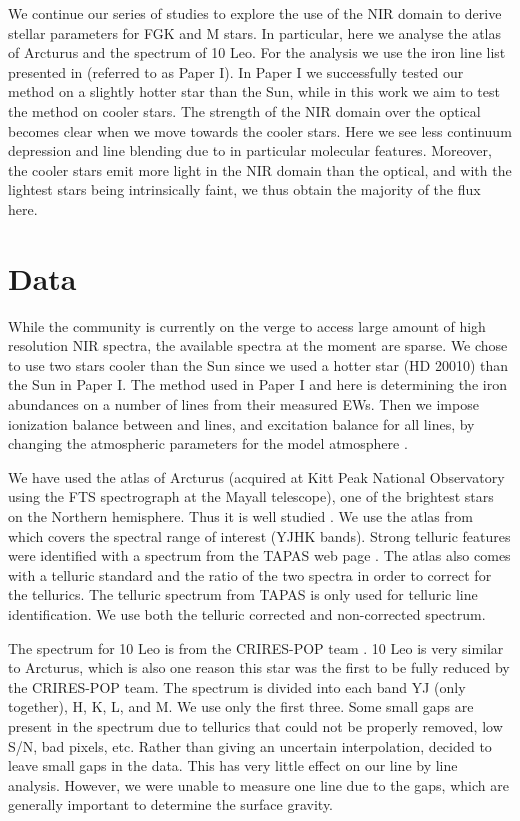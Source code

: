 \documentclass{aa}
\begin{document}
We continue our series of studies to explore the use of the NIR domain to derive
stellar parameters for FGK and M stars. In particular, here we analyse the atlas
of Arcturus and the spectrum of 10 Leo. For the analysis we use the iron line
list presented in \citet{Andreasen2016} (referred to as Paper I). In Paper I we
successfully tested our method on a slightly hotter star than the Sun, while in
this work we aim to test the method on cooler stars. The strength of the NIR
domain over the optical becomes clear when we move towards the cooler stars.
Here we see less continuum depression and line blending due to in particular
molecular features. Moreover, the cooler stars emit more light in the NIR domain
than the optical, and with the lightest stars being intrinsically faint, we thus
obtain the majority of the flux here.



\section{Data}
\label{sec:data}

While the community is currently on the verge to access large amount of high
resolution NIR spectra, the available spectra at the moment are sparse. We chose
to use two stars cooler than the Sun since we used a hotter star (HD 20010) than
the Sun in Paper I. The method used in Paper I and here is determining the iron
abundances on a number of lines from their measured EWs. Then we impose
ionization balance between  and  lines, and excitation
balance for all  lines, by changing the atmospheric parameters for
the model atmosphere \citep[][is used here]{Kurucz1993}.

We have used the atlas of Arcturus (acquired at Kitt Peak National Observatory
using the FTS spectrograph at the Mayall telescope), one of the brightest stars
on the Northern hemisphere. Thus it is well studied \citep[see e.g.][to mention
just a few]{Griffin1967,McWilliam1990,Ramirez2013}. We use the atlas from
\cite{Hinkle2003} which covers the spectral range of interest (YJHK bands).
Strong telluric features were identified with a spectrum from the TAPAS web page
\citep{Bertaux2014}. The atlas also comes with a telluric standard and the ratio
of the two spectra in order to correct for the tellurics. The telluric spectrum
from TAPAS is only used for telluric line identification. We use both the
telluric corrected and non-corrected spectrum.

The spectrum for 10 Leo is from the CRIRES-POP team \citep{Nicholls2016}. 10 Leo
is very similar to Arcturus, which is also one reason this star was the first to
be fully reduced by the CRIRES-POP team. The spectrum is divided into each band
YJ (only together), H, K, L, and M. We use only the first three. Some small gaps
are present in the spectrum due to tellurics that could not be properly removed,
low S/N, bad pixels, etc. Rather than giving an uncertain interpolation,
\citet{Nicholls2016} decided to leave small gaps in the data. This has very
little effect on our line by line analysis. However, we were unable to measure
one  line due to the gaps, which are generally important to
determine the surface gravity.
\end{document}
